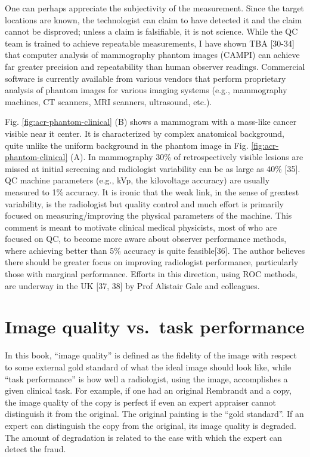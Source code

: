 \documentclass[
]{book}
\begin{document}
One can perhaps appreciate the subjectivity of the measurement. Since the target locations are known, the technologist can claim to have detected it and the claim cannot be disproved; unless a claim is falsifiable, it is not science. While the QC team is trained to achieve repeatable measurements, I have shown TBA {[}30-34{]} that computer analysis of mammography phantom images (CAMPI) can achieve far greater precision and repeatability than human observer readings. Commercial software is currently available from various vendors that perform proprietary analysis of phantom images for various imaging systems (e.g., mammography machines, CT scanners, MRI scanners, ultrasound, etc.).

Fig. \ref{fig:acr-phantom-clinical} (B) shows a mammogram with a mass-like cancer visible near it center. It is characterized by complex anatomical background, quite unlike the uniform background in the phantom image in Fig. \ref{fig:acr-phantom-clinical} (A). In mammography 30\% of retrospectively visible lesions are missed at initial screening and radiologist variability can be as large as 40\% {[}35{]}. QC machine parameters (e.g., kVp, the kilovoltage accuracy) are usually measured to 1\% accuracy. It is ironic that the weak link, in the sense of greatest variability, is the radiologist but quality control and much effort is primarily focused on measuring/improving the physical parameters of the machine. This comment is meant to motivate clinical medical physicists, most of who are focused on QC, to become more aware about observer performance methods, where achieving better than 5\% accuracy is quite feasible{[}36{]}. The author believes there should be greater focus on improving radiologist performance, particularly those with marginal performance. Efforts in this direction, using ROC methods, are underway in the UK {[}37, 38{]} by Prof Alistair Gale and colleagues.

\hypertarget{image-quality-vs.-task-performance}{%
\section{Image quality vs.~task performance}\label{image-quality-vs.-task-performance}}

In this book, ``image quality'' is defined as the fidelity of the image with respect to some external gold standard of what the ideal image should look like, while ``task performance'' is how well a radiologist, using the image, accomplishes a given clinical task. For example, if one had an original Rembrandt and a copy, the image quality of the copy is perfect if even an expert appraiser cannot distinguish it from the original. The original painting is the ``gold standard''. If an expert can distinguish the copy from the original, its image quality is degraded. The amount of degradation is related to the ease with which the expert can detect the fraud.
\end{document}
